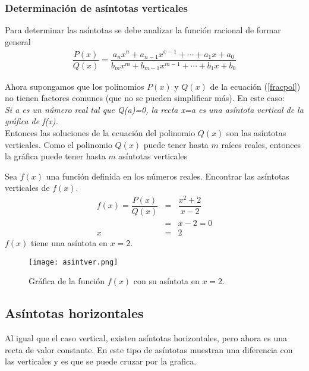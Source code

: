 \subsubsection{Determinación de asíntotas verticales}

Para determinar las asíntotas se debe analizar la función racional de formar general
\begin{eqnarray}
\dfrac{P(x)}{Q(x)}=\dfrac{a_{n}x^{n}+a_{n-1}x^{x-1}+\cdots +a_{1}x+a_{0}}{b_{m}x^{m}+b_{m-1}x^{m-1}+\cdots + b_{1}x+b_{0}}
\label{fracpol}
\end{eqnarray}

Ahora supongamos que los polinomios $P(x)$ y $Q(x)$ de la ecuación (\ref{fracpol}) no tienen factores comunes (que no se pueden simplificar más). En este caso: \\

\textit{Si a es un número real tal que Q(a)=0, la recta x=a es una asíntota vertical de la gráfica de f(x).}\\

Entonces las soluciones de la ecuación del polinomio $Q(x)$ son las asíntotas verticales. Como el polinomio $Q(x)$ puede tener hasta $m$ raíces reales, entonces la gráfica puede tener hasta $m$ asíntotas verticales 
\begin{myexample}
Sea $f(x)$ una función definida en los números reales. Encontrar las asíntotas verticales de $f(x)$.
\begin{eqnarray*}
f(x)=\dfrac{P(x)}{Q(x)}&=&\dfrac{x^{2}+2}{x-2} \\
&=& x-2=0\\
x &=& 2
\end{eqnarray*}
$f(x)$ tiene una asíntota en $x=2$.

 \begin{center}
\begin{figure}[h!]
\centering
\texttt{[image: asintver.png]}
\caption{Gráfica de la función $f(x)$ con su asíntota en $x=2$.} \label{asintvert1}
\end{figure}
\end{center}
\end{myexample}
\newpage
\subsection{Asíntotas horizontales}
Al igual que el caso vertical, existen asíntotas horizontales, pero ahora es una recta de valor constante. En este tipo de asíntotas muestran una diferencia con las verticales y es que se puede cruzar por la grafica.

